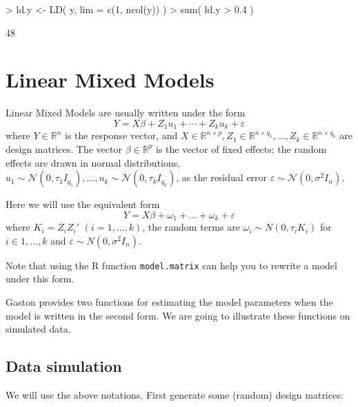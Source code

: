 \documentclass{article}
\let\epsilon\varepsilon
\renewenvironment{Schunk}{\vspace{\topsep}}{\vspace{\topsep}}
\begin{document}
\begin{Schunk}
\begin{Sinput}
> ld.y <- LD( y, lim = c(1, ncol(y)) )
> sum( ld.y > 0.4 )
\end{Sinput}
\begin{Soutput}
[1] 48
\end{Soutput}
\end{Schunk}

\vfill\eject
\section{Linear Mixed Models}

\def\R{\mathbb{R}}
\def\N{\mathcal{N}}

  Linear Mixed Models are usually written under the form
  \begin{equation*}
    Y = X\beta + Z_1 u_1 + \cdots + Z_k u_k + \varepsilon
  \end{equation*}
  where $Y \in\R^{n}$ is the response vector, and $X\in \R^{n\times p}, Z_1 \in \R^{n\times q_1}, \dots, Z_k \in\R^{n\times q_k}$ are
  design matrices. The vector $\beta\in\R^p$ is the vector of fixed effects; the random effects are drawn in 
  normal distributions, $u_1\sim \N(0, \tau_1 I_{q_1}), \dots, u_k\sim \N(0, \tau_k I_{q_k})$, as the residual
  error $\epsilon\sim\N(0,\sigma^2 I_n)$.

  Here we will use the equivalent form 
  \begin{equation*}
    Y = X\beta + \omega_1 + \ldots + \omega_k + \varepsilon
  \end{equation*}
  where $K_i = Z_i Z_i'$ $(i = 1, \dots, k)$,
  the random terms are $\omega_i \sim N(0,\tau_i K_i)$ for $i \in 1, \dots,k$ and $\varepsilon \sim N(0,\sigma^2 I_n)$.

  Note that using the R function \verb!model.matrix! can help you to rewrite a model under this form.

  Gaston provides two functions for estimating the model parameters when the model is
  written in the second form. We are going to illustrate these functions on simulated
  data.

  \subsection{Data simulation}

  We will use the above notations. First generate some (random) design matrices:
 
\end{document}
